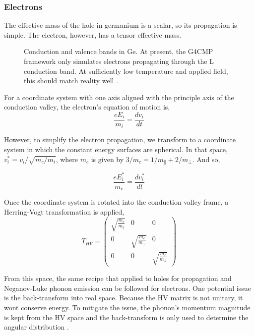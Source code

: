 \subsubsection{Electrons}
The effective mass of the hole in germanium is a scalar, so its
propagation is simple. The electron, however, has a tensor effective mass.
\begin{figure}[htpb]
    \centering
    \caption{Conduction and valence bands in Ge. At present, the G4CMP
    framework only simulates electrons propagating through the L conduction
band. At sufficiently low temperature and applied field, this should match
reality well \cite{Leman}.}
    \label{fig:gebands}
\end{figure}

For a coordinate system with one axis aligned with the principle axis of the
conduction valley, the electron's equation of motion is,
\begin{equation}
    \frac{eE_i}{m_i} = \frac{dv_i}{dt}
    \label{el_eq_mtn}
\end{equation}

However, to simplify the electron propagation, we transform to a coordinate
system in which the constant energy surfaces are spherical. In that space,
$v_i^* = v_i/\sqrt{m_c/m_i}$, where $m_c$ is given by $3/m_c = 1/m_\parallel +
2/m_\perp$. And so,

\begin{equation}
    \frac{eE^*_i}{m_c} = \frac{dv_i^*}{dt}
    \label{el_eq_mtn1}
\end{equation}

Once the coordinate system is rotated into the conduction valley frame, a
Herring-Vogt transformation is applied,
\begin{equation}
    T_{HV} = \left( \begin{array}{ccc}
                    \sqrt{\frac{m_c}{m_{\parallel}}} & 0 & 0 \\
                    0 & \sqrt{\frac{m_c}{m_{\perp}}} & 0 \\
                    0 & 0 & \sqrt{\frac{m_c}{m_{\perp}}}\end{array}\right)
    \label{HV}
\end{equation}

From this space, the same recipe that applied to holes for propagation and
Neganov-Luke phonon emission can be followed for electrons. One potential issue
is the back-transform into real space. Because the HV matrix is not unitary, it
wont conserve energy. To mitigate the issue, the phonon's momentum magnitude is
kept from the HV space and the back-transform is only used to determine the
angular distribution \cite{Leman}.



